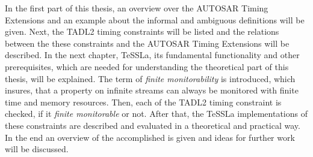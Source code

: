 	In the first part of this thesis, an overview over the AUTOSAR Timing Extensions and an example about the informal and ambiguous definitions  will be given. Next, the TADL2 timing constraints will be listed and the relations between the these constraints and the AUTOSAR Timing Extensions will be described.
	In the next chapter, TeSSLa, its fundamental functionality and other prerequisites, which are needed for understanding the theoretical part of this thesis, will be explained.
	The term of \emph{finite monitorability} is introduced, which insures, that a property on infinite streams can always be monitored with finite time and memory resources.
	Then, each of the TADL2 timing constraint is checked, if it \textit{finite monitorable} or not. After that, the TeSSLa implementations of these constraints are described and evaluated in a theoretical and practical way.\\
	In the end an overview of the accomplished is given and ideas for further work will be discussed.